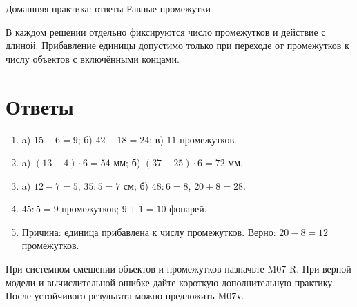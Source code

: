\worksheettitle
  {Домашняя практика: ответы}
  { Равные промежутки}

\begin{teacherbox}[Критерии]
  В каждом решении отдельно фиксируются число промежутков и действие с
  длиной. Прибавление единицы допустимо только при переходе от промежутков
  к числу объектов с включёнными концами.
\end{teacherbox}

\section{Ответы}

\begin{enumerate}
  \item a) $15-6=9$; б) $42-18=24$; в) $11$ промежутков.
  \item a) $(13-4)\cdot6=54$ мм;
    б) $(37-25)\cdot6=72$ мм.
  \item a) $12-7=5$, $35:5=7$ см;
    б) $48:6=8$, $20+8=28$.
  \item $45:5=9$ промежутков; $9+1=10$ фонарей.
  \item Причина: единица прибавлена к числу промежутков. Верно:
    $20-8=12$ промежутков.
\end{enumerate}

\begin{resultbox}[Маршрут]
  При системном смешении объектов и промежутков назначьте M07-R. При верной
  модели и вычислительной ошибке дайте короткую дополнительную практику.
  После устойчивого результата можно предложить M07\(\star\).
\end{resultbox}
